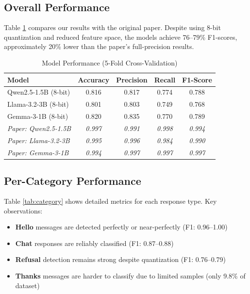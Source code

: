 \documentclass[11pt]{article}
\begin{document}
\subsection{Overall Performance}

Table \ref{tab:overall} compares our results with the original paper. Despite using 8-bit quantization and reduced feature space, the models achieve 76--79\% F1-scores, approximately 20\% lower than the paper's full-precision results.

\begin{table}[H]
\centering
\caption{Model Performance (5-Fold Cross-Validation)}
\label{tab:overall}
\begin{tabular}{@{}lcccc@{}}
\toprule
\textbf{Model} & \textbf{Accuracy} & \textbf{Precision} & \textbf{Recall} & \textbf{F1-Score} \\
\midrule
Qwen2.5-1.5B (8-bit) & 0.816 & 0.817 & 0.774 & 0.788 \\
Llama-3.2-3B (8-bit) & 0.801 & 0.803 & 0.749 & 0.768 \\
Gemma-3-1B (8-bit) & 0.820 & 0.835 & 0.770 & 0.789 \\
\midrule
\textit{Paper: Qwen2.5-1.5B} & \textit{0.997} & \textit{0.991} & \textit{0.998} & \textit{0.994} \\
\textit{Paper: Llama-3.2-3B} & \textit{0.995} & \textit{0.996} & \textit{0.984} & \textit{0.990} \\
\textit{Paper: Gemma-3-1B} & \textit{0.994} & \textit{0.997} & \textit{0.997} & \textit{0.997} \\
\bottomrule
\end{tabular}
\end{table}

\subsection{Per-Category Performance}

Table \ref{tab:category} shows detailed metrics for each response type. Key observations:
\begin{itemize}
    \item \textbf{Hello} messages are detected perfectly or near-perfectly (F1: 0.96--1.00)
    \item \textbf{Chat} responses are reliably classified (F1: 0.87--0.88)
    \item \textbf{Refusal} detection remains strong despite quantization (F1: 0.76--0.79)
    \item \textbf{Thanks} messages are harder to classify due to limited samples (only 9.8\% of dataset)
\end{itemize}
\end{document}

